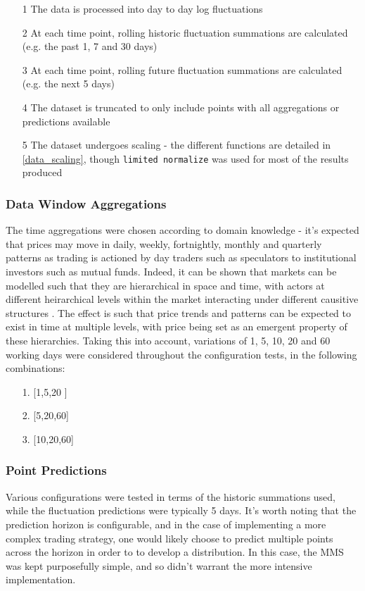 \documentclass[a4paper,11pt,oneside]{article}
\theoremstyle{plain}
\theoremstyle{definition}
\begin{document}
	\begin{itemize}
		\item[1] The data is processed into day to day log fluctuations
		\item[2] At each time point, rolling historic fluctuation summations are calculated (e.g. the past 1, 7 and 30 days)
		\item[3] At each time point, rolling future fluctuation summations are calculated (e.g. the next 5 days)
		\item[4] The dataset is truncated to only include points with all aggregations or predictions available
		\item[5] The dataset undergoes scaling - the different functions are detailed in \ref{data_scaling}, though \texttt{limited normalize} was used for most of the results produced
	\end{itemize}
	
	\subsubsection{Data Window Aggregations} The time aggregations were chosen according to domain knowledge - it's expected that prices may move in daily, weekly, fortnightly, monthly and quarterly patterns as trading is actioned by day traders such as speculators to institutional investors such as mutual funds. Indeed, it can be shown that markets can be modelled such that they are hierarchical in space and time, with actors at different heirarchical levels within the market interacting under different causitive structures \cite{Wilcox}. The effect is such that price trends and patterns can be expected to exist in time at multiple levels, with price being set as an emergent property of these hierarchies. Taking this into account, variations of 1, 5, 10, 20 and 60 working days were considered throughout the configuration tests, in the following combinations:  
	\begin{itemize}
		\item[1.] [1,5,20 ]
		\item[2.] [5,20,60]
		\item[3.] [10,20,60]
	\end{itemize}
	
	\subsubsection {Point Predictions} Various configurations were tested in terms of the historic summations used, while the fluctuation predictions were typically 5 days. It's worth noting that the prediction horizon is configurable, and in the case of implementing a more complex trading strategy, one would likely choose to predict multiple points across the horizon in order to to develop a distribution. In this case, the MMS was kept purposefully simple, and so didn't warrant the more intensive implementation. \newline
	
\end{document}
